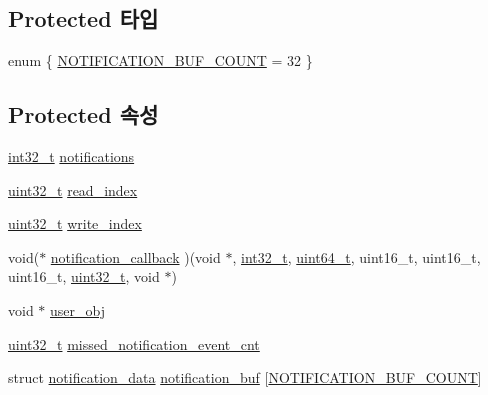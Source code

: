 \subsection*{Protected 타입}
\begin{DoxyCompactItemize}
\item 
enum \{ \hyperlink{classavdecc__lib_1_1notification_abc6126af1d45847bc59afa0aa3216b04ada38b9a5f8c87a3601acb7600b015401}{N\+O\+T\+I\+F\+I\+C\+A\+T\+I\+O\+N\+\_\+\+B\+U\+F\+\_\+\+C\+O\+U\+NT} = 32
 \}
\end{DoxyCompactItemize}
\subsection*{Protected 속성}
\begin{DoxyCompactItemize}
\item 
\hyperlink{parse_8c_a37994e3b11c72957c6f454c6ec96d43d}{int32\+\_\+t} \hyperlink{classavdecc__lib_1_1notification_a02a497f6526df74aec4060942683da34}{notifications}
\item 
\hyperlink{parse_8c_a6eb1e68cc391dd753bc8ce896dbb8315}{uint32\+\_\+t} \hyperlink{classavdecc__lib_1_1notification_a2ccf0f8cb3b20ac18cc9c7bcff1084ad}{read\+\_\+index}
\item 
\hyperlink{parse_8c_a6eb1e68cc391dd753bc8ce896dbb8315}{uint32\+\_\+t} \hyperlink{classavdecc__lib_1_1notification_a44d246646acf5f95a78a87d606f22a42}{write\+\_\+index}
\item 
void($\ast$ \hyperlink{classavdecc__lib_1_1notification_a0aaf6a2e3f6d6e3fb6b416e9c2f7f6e9}{notification\+\_\+callback} )(void $\ast$, \hyperlink{parse_8c_a37994e3b11c72957c6f454c6ec96d43d}{int32\+\_\+t}, \hyperlink{parse_8c_aec6fcb673ff035718c238c8c9d544c47}{uint64\+\_\+t}, uint16\+\_\+t, uint16\+\_\+t, uint16\+\_\+t, \hyperlink{parse_8c_a6eb1e68cc391dd753bc8ce896dbb8315}{uint32\+\_\+t}, void $\ast$)
\item 
void $\ast$ \hyperlink{classavdecc__lib_1_1notification_af3646c45b560aeab38e708886dec0d93}{user\+\_\+obj}
\item 
\hyperlink{parse_8c_a6eb1e68cc391dd753bc8ce896dbb8315}{uint32\+\_\+t} \hyperlink{classavdecc__lib_1_1notification_a55b9ebbf69af44fa3923a8da478f9b27}{missed\+\_\+notification\+\_\+event\+\_\+cnt}
\item 
struct \hyperlink{structavdecc__lib_1_1notification_1_1notification__data}{notification\+\_\+data} \hyperlink{classavdecc__lib_1_1notification_a87642905af524dd0472d4646f3cea881}{notification\+\_\+buf} \mbox{[}\hyperlink{classavdecc__lib_1_1notification_abc6126af1d45847bc59afa0aa3216b04ada38b9a5f8c87a3601acb7600b015401}{N\+O\+T\+I\+F\+I\+C\+A\+T\+I\+O\+N\+\_\+\+B\+U\+F\+\_\+\+C\+O\+U\+NT}\mbox{]}
\end{DoxyCompactItemize}
